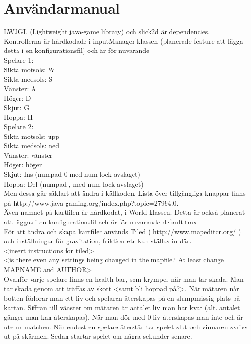 \section{Användarmanual}
LWJGL (Lightweight java-game library) och slick2d är dependencies.\\
\vspace{11pt}
Kontrollerna är hårdkodade i inputManager-klassen (planerade feature att lägga detta i en konfigurationsfil) och är för nuvarande\\
\vspace{11pt}
Spelare 1:\\
Sikta motsols: W\\
Sikta medsols: S\\
Vänster: A\\
Höger: D\\
Skjut: G\\
Hoppa: H\\
\vspace{11pt}
Spelare 2:\\
Sikta motsols: upp\\
Sikta medsols: ned\\
Vänster: vänster\\
Höger: höger\\
Skjut: Ins (numpad 0 med num lock avslaget)\\
Hoppa: Del (numpad , med num lock avslaget)\\
\vspace{11pt}
Men dessa går såklart att ändra i källkoden. Lista över tillgängliga knappar finns på \url{http://www.java-gaming.org/index.php?topic=27994.0}.\\
\vspace{11pt}
\vspace{11pt}
Även namnet på kartfilen är hårdkodat, i World-klassen. Detta är också planerat att läggas i en konfigurationsfil och är för nuvarande default.tmx .\\
För att ändra och skapa kartfiler används Tiled ( \url{http://www.mapeditor.org/} ) och inställningar för gravitation, friktion etc kan ställas in där.\\
\vspace{11pt}
{\color{red}<insert instructions for tiled>\\
<is there even any settings being changed in the mapfile? At least change MAPNAME and AUTHOR>\\}
\vspace{11pt}
Ovanför varje spelare finns en health bar, som krymper när man tar skada. Man tar skada genom att träffas av skott <samt bli hoppad på?>. När mätaren når botten förlorar man ett liv och spelaren återskapas på en slumpmässig plats på kartan. Siffran till vänster om mätaren är antalet liv man har kvar (alt. antalet gånger man kan återskapas). När man dör med 0 liv återskapas man inte och är ute ur matchen. När endast en spelare återstår tar spelet slut och vinnaren skrivs ut på skärmen. Sedan startar spelet om några sekunder senare.\\

